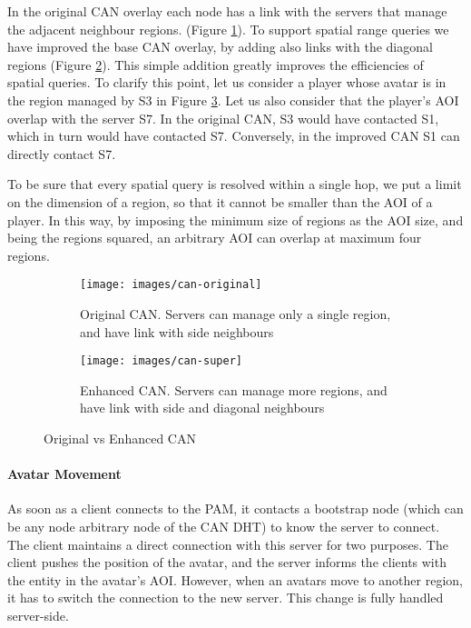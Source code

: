 \documentclass[final,10pt,a5paper]{phdimt}
\theoremstyle{definition}
\begin{document}
In the original CAN overlay each node has a link with the servers that manage the adjacent neighbour regions. (Figure \ref{fig:can-original}). To support spatial range queries we have improved the base CAN overlay, by adding also links with the diagonal regions (Figure \ref{fig:can-super}).
This simple addition greatly improves the efficiencies of spatial queries. 
To clarify this point, let us consider a player whose avatar is in the region managed by S3 in Figure \ref{fig:can-vs}. 
Let us also consider that the player's AOI overlap with the server S7.
In the original CAN, S3 would have contacted S1, which in turn would have contacted S7.
Conversely, in the improved CAN S1 can directly contact S7.

To be sure that every spatial query is resolved within a single hop, we put a limit on the dimension of a region, so that it cannot be smaller than the AOI of a player. In this way, by imposing the minimum size of regions as the AOI size, and being the regions squared, an arbitrary AOI can overlap at maximum four regions.


\begin{figure}[tbh]
        \centering
        \begin{subfigure}[b]{0.45\textwidth}
                \centering
                \texttt{[image: images/can-original]}
                \caption{Original CAN. Servers can manage only a single region, and have link with side neighbours}
                \label{fig:can-original}
        \end{subfigure}\quad
        \begin{subfigure}[b]{0.45\textwidth}
                \centering
                \texttt{[image: images/can-super]}
                \caption{Enhanced CAN. Servers can manage more regions, and have link with side and diagonal neighbours}
                \label{fig:can-super}
        \end{subfigure}
        \caption{Original vs Enhanced CAN}\label{fig:can-vs}
\end{figure}







\paragraph{Avatar Movement}

As soon as a client connects to the PAM, it contacts a bootstrap node (which can be any node arbitrary node of the CAN DHT) to know the server to connect. The client maintains a direct connection with this server for two purposes. The client pushes the position of the avatar, and the server informs the clients with the entity in the avatar's AOI. However, when an avatars move to another region, it has to switch the connection to the new server. This change is fully handled server-side.
\end{document}
